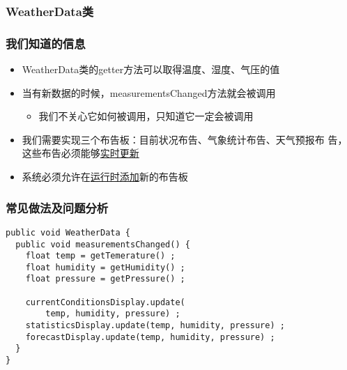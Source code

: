\documentclass[compress]{beamer}
\begin{document}
{

\begin{frame}
  \frametitle{WeatherData类}

  \noindent{}
\end{frame}
}

\begin{frame}
  \frametitle{我们知道的信息}
  \begin{itemize}
    \item  WeatherData类的getter方法可以取得温度、湿度、气压的值
    \item 当有新数据的时候，measurementsChanged方法就会被调用
      \begin{itemize}
        \item 我们不关心它如何被调用，只知道它一定会被调用
      \end{itemize}
    \item 我们需要实现三个布告板：目前状况布告、气象统计布告、天气预报布
      告，这些布告必须能够\uline{实时更新}
    \item 系统必须允许在\uline{运行时添加}新的布告板
  \end{itemize}
\end{frame}

\begin{frame}[fragile]
  \frametitle{常见做法及问题分析}

\begin{Verbatim}[label=一种常见的做法]
public void WeatherData {
  public void measurementsChanged() {
    float temp = getTemerature() ;
    float humidity = getHumidity() ;
    float pressure = getPressure() ;

    currentConditionsDisplay.update(
        temp, humidity, pressure) ;
    statisticsDisplay.update(temp, humidity, pressure) ;
    forecastDisplay.update(temp, humidity, pressure) ;
  }
}
\end{Verbatim}
\end{frame}
\end{document}
